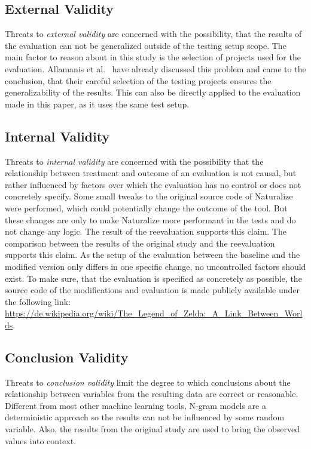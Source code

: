 \subsection{External Validity}
Threats to \emph{external validity} are concerned with the possibility, that the results of the evaluation can not be generalized outside of the testing setup scope. The main factor to reason about in this study is the selection of projects used for the evaluation. Allamanis et al.~\cite{naturalize} have already discussed this problem and came to the conclusion, that their careful selection of the testing projects ensures the generalizability of the results. This can also be directly applied to the evaluation made in this paper, as it uses the same test setup.

\subsection{Internal Validity}
Threats to \emph{internal validity} are concerned with the possibility that the relationship between treatment and outcome of an evaluation is not causal, but rather influenced by factors over which the evaluation has no control or does not concretely specify. Some small tweaks to the original source code of Naturalize were performed, which could potentially change the outcome of the tool. But these changes are only to make Naturalize more performant in the tests and do not change any logic. The result of the reevaluation supports this claim. The comparison between the results of the original study and the reevaluation supports this claim.
As the setup of the evaluation between the baseline and the modified version only differs in one specific change, no uncontrolled factors should exist. To make sure, that the evaluation is specified as concretely as possible, the source code of the modifications and evaluation is made publicly available under the following link: \href{A Link between Sites}{\url{https://de.wikipedia.org/wiki/The_Legend_of_Zelda:_A_Link_Between_Worlds}}.

\subsection{Conclusion Validity}
Threats to \emph{conclusion validity} limit the degree to which conclusions about the relationship between variables from the resulting data are correct or reasonable. Different from most other machine learning tools, N-gram models are a deterministic approach so the results can not be influenced by some random variable. Also, the results from the original study are used to bring the observed values into context.
